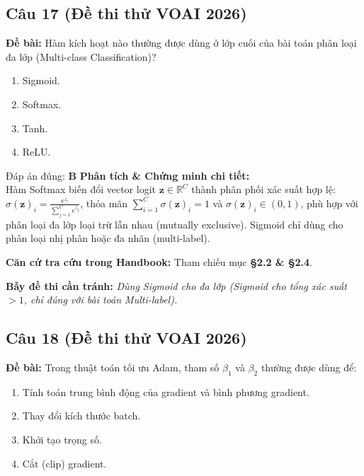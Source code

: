 \documentclass[10pt,a4paper]{article}
\begin{document}
\subsection*{Câu 17 (Đề thi thử VOAI 2026)}
\textbf{Đề bài:} Hàm kích hoạt nào thường được dùng ở lớp cuối của bài toán phân loại đa lớp (Multi-class Classification)?

\begin{enumerate}[label=\textbf{\Alph*.}]
    \item Sigmoid.
    \item Softmax.
    \item Tanh.
    \item ReLU.
\end{enumerate}

\begin{solbox}{Đáp án đúng: \textbf{B}}
\textbf{Phân tích \& Chứng minh chi tiết:} \\
Hàm Softmax biến đổi vector logit $\mathbf{z} \in \mathbb{R}^C$ thành phân phối xác suất hợp lệ: $\sigma(\mathbf{z})_i = \frac{e^{z_i}}{\sum_{j=1}^C e^{z_j}}$, thỏa mãn $\sum_{i=1}^C \sigma(\mathbf{z})_i = 1$ và $\sigma(\mathbf{z})_i \in (0, 1)$, phù hợp với phân loại đa lớp loại trừ lẫn nhau (mutually exclusive). Sigmoid chỉ dùng cho phân loại nhị phân hoặc đa nhãn (multi-label).

\vspace{0.4em}
\textbf{Căn cứ tra cứu trong Handbook:} Tham chiếu mục \textbf{§2.2 \& §2.4}.

\vspace{0.4em}
\textbf{Bẫy đề thi cần tránh:} \textit{Dùng Sigmoid cho đa lớp (Sigmoid cho tổng xác suất $> 1$, chỉ đúng với bài toán Multi-label).}
\end{solbox}
\vspace{0.5em}


\subsection*{Câu 18 (Đề thi thử VOAI 2026)}
\textbf{Đề bài:} Trong thuật toán tối ưu Adam, tham số $\beta_1$ và $\beta_2$ thường được dùng để:

\begin{enumerate}[label=\textbf{\Alph*.}]
    \item Tính toán trung bình động của gradient và bình phương gradient.
    \item Thay đổi kích thước batch.
    \item Khởi tạo trọng số.
    \item Cắt (clip) gradient.
\end{enumerate}
\end{document}
